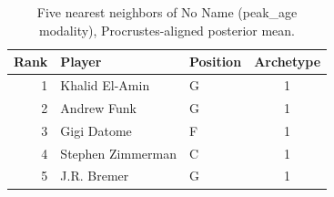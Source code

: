 \begin{table}[htbp]
  \centering\small
  \begin{tabular}{rllc}
    \toprule
    Rank & Player & Position & Archetype \\
    \midrule
    1 & Khalid El-Amin & G & 1 \\
    2 & Andrew Funk & G & 1 \\
    3 & Gigi Datome & F & 1 \\
    4 & Stephen Zimmerman & C & 1 \\
    5 & J.R. Bremer & G & 1 \\
    \bottomrule
  \end{tabular}
  \caption{Five nearest neighbors of No Name (peak_age modality), Procrustes-aligned posterior mean.}
  \label{tab:No_Name_neighbors_peak_age}
\end{table}


